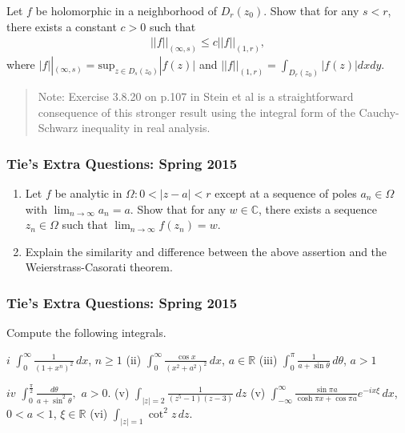 Let \(f\) be holomorphic in a neighborhood of \(D_r(z_0)\). Show that
for any \(s<r\), there exists a constant \(c>0\) such that
\begin{align*}||f||_{(\infty, s)} \leq c ||f||_{(1, r)},\end{align*}
where
\(\displaystyle |f||_{(\infty, s)} = \text{sup}_{z \in D_s(z_0)}|f(z)|\)
and \(\displaystyle ||f||_{(1, r)} = \int_{D_r(z_0)} |f(z)|dx dy\).

\begin{quote}
Note: Exercise 3.8.20 on p.107 in Stein et al is a straightforward
consequence of this stronger result using the integral form of the
Cauchy-Schwarz inequality in real analysis.
\end{quote}

\hypertarget{ties-extra-questions-spring-2015-10}{%
\subsubsection{Tie's Extra Questions: Spring
2015}\label{ties-extra-questions-spring-2015-10}}

\begin{enumerate}
\def\labelenumi{(\arabic{enumi})}
\item
  Let \(f\) be analytic in \(\Omega: 0<|z-a|<r\) except at a sequence of
  poles \(a_n \in \Omega\) with \(\lim_{n \rightarrow \infty} a_n = a\).
  Show that for any \(w \in \mathbb C\), there exists a sequence
  \(z_n \in \Omega\) such that
  \(\lim_{n \rightarrow \infty} f(z_n) = w\).
\item
  Explain the similarity and difference between the above assertion and
  the Weierstrass-Casorati theorem.
\end{enumerate}

\hypertarget{ties-extra-questions-spring-2015-11}{%
\subsubsection{Tie's Extra Questions: Spring
2015}\label{ties-extra-questions-spring-2015-11}}

Compute the following integrals.

\(i\) \(\displaystyle \int_0^\infty \frac{1}{(1 + x^n)^2} \, dx\),
\(n \geq 1\) (ii)
\(\displaystyle \int_0^\infty \frac{\cos x}{(x^2 + a^2)^2} \, dx\),
\(a \in \mathbb R\) (iii)
\(\displaystyle \int_0^\pi \frac{1}{a + \sin \theta} \, d \theta\),
\(a>1\)

\(iv\)
\(\displaystyle \int_0^{\frac{\pi}{2}} \frac{d \theta}{a+ \sin ^2 \theta},\)
\(a >0\). (v)
\(\displaystyle \int_{|z|=2} \frac{1}{(z^{5} -1) (z-3)} \, dz\) (v)
\(\displaystyle \int_{- \infty}^{\infty} \frac{\sin \pi a}{\cosh \pi x + \cos \pi a} e^{- i x \xi} \, d x\),
\(0< a <1\), \(\xi \in \mathbb R\) (vi)
\(\displaystyle \int_{|z| = 1} \cot^2 z \, dz\).


